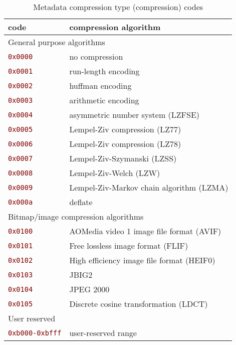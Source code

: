 \documentclass[pagesize=a4]{tufte-book}
\makeatletter
\newcommand{\hex}[1]{\hlred{\texttt{#1}}\label{clsopt:#1}\index{#1 class option@\texttt{#1} class option}\index{class options!#1@\texttt{#1}}}%
\newcommand{\hlred}[1]{\textcolor{Maroon}{#1}}%
\makeatother
\begin{document}
\begin{table}[ht]
	\centering
	\selectfont
	\begin{tabular}{ll}
		\toprule
		code & compression algorithm\\
		\midrule
		\multicolumn{2}{l}{General purpose algorithms}\\
		\quad\hex{0x0000} & no compression\\
		\quad\hex{0x0001} & run-length encoding\\
		\quad\hex{0x0002} & huffman encoding\\
		\quad\hex{0x0003} & arithmetic encoding\\
		\quad\hex{0x0004} & asymmetric number system (LZFSE)\\
		\quad\hex{0x0005} & Lempel-Ziv compression (LZ77)\\
		\quad\hex{0x0006} & Lempel-Ziv compression (LZ78)\\
		\quad\hex{0x0007} & Lempel-Ziv-Szymanski (LZSS)\\
		\quad\hex{0x0008} & Lempel-Ziv-Welch (LZW)\\
		\quad\hex{0x0009} & Lempel-Ziv-Markov chain algorithm (LZMA)\\
		\quad\hex{0x000a} & deflate\\
		\multicolumn{2}{l}{Bitmap/image compression algorithms}\\
		\quad\hex{0x0100} & AOMedia video 1 image file format (AVIF)\\
		\quad\hex{0x0101} & Free lossless image format (FLIF)\\
		\quad\hex{0x0102} & High efficiency image file format (HEIF0)\\
		\quad\hex{0x0103} & JBIG2\\
		\quad\hex{0x0104} & JPEG 2000\\
		\quad\hex{0x0105} & Discrete cosine transformation (LDCT)\\
		\multicolumn{2}{l}{User reserved}\\
		\quad\hex{0xb000-0xbfff} & user-reserved range\\
		\bottomrule
	\end{tabular}
	~\label{tab:compression_types}
	\caption{Metadata compression type (compression) codes}
\end{table}

\backmatter

\printindex
\end{document}
